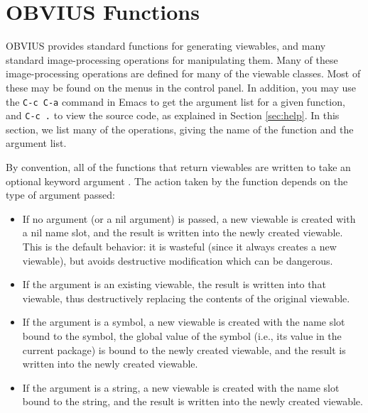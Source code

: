 \section{OBVIUS Functions}
\label{sec:operations}

OBVIUS provides standard functions for generating viewables, and many
standard image-processing operations for manipulating them.  Many of
these image-processing operations are defined for many of the viewable
classes.  Most of these may be found on the menus in the control
panel.  In addition, you may use the {\tt C-c C-a} command in Emacs to
get the argument list for a given function, and {\tt C-c .} to view
the source code, as explained in Section \ref{sec:help}.  In this
section, we list many of the operations, giving the name of the
function and the argument list.


By convention, all of the functions that return viewables are written
to take an optional keyword argument \lsym{:->}.  The action taken by
the function depends on the type of argument passed:
\begin{itemize}
\item If no argument (or a nil argument) is passed, a new viewable is
created with a nil name slot, and the result is written into the newly
created viewable.  This is the default behavior: it is wasteful (since
it always creates a new viewable), but avoids destructive modification
which can be dangerous.

\item If the argument is an existing viewable, the result is
written into that viewable, thus destructively replacing the contents
of the original viewable.

\item If the argument is a symbol, a new viewable is created with
the name slot bound to the symbol, the global value of the symbol
(i.e., its value in the current package) is bound to the newly created
viewable, and the result is written into the newly created viewable.

\item If the argument is a string, a new viewable is created with 
the name slot bound to the string, and the result is written 
into the newly created viewable.
\end{itemize}
	

